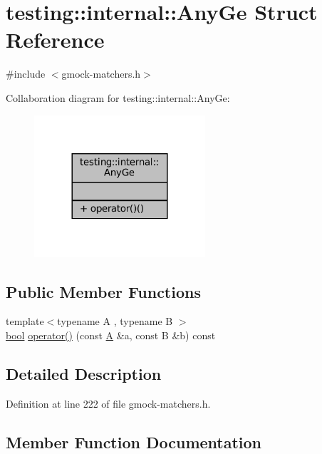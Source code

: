 \hypertarget{structtesting_1_1internal_1_1AnyGe}{}\section{testing\+:\+:internal\+:\+:Any\+Ge Struct Reference}
\label{structtesting_1_1internal_1_1AnyGe}


{\ttfamily \#include $<$gmock-\/matchers.\+h$>$}



Collaboration diagram for testing\+:\+:internal\+:\+:Any\+Ge\+:
\nopagebreak
\begin{figure}[H]
\begin{center}
\leavevmode
\includegraphics[width=180pt]{structtesting_1_1internal_1_1AnyGe__coll__graph}
\end{center}
\end{figure}
\subsection*{Public Member Functions}
\begin{DoxyCompactItemize}
\item 
{\footnotesize template$<$typename A , typename B $>$ }\\\hyperlink{classbool}{bool} \hyperlink{structtesting_1_1internal_1_1AnyGe_ac4bace6395f9517bc93f34bc1479227d}{operator()} (const \hyperlink{namespacetesting_a5e9134d655d2fc9323902348083282e7}{A} \&a, const B \&b) const
\end{DoxyCompactItemize}


\subsection{Detailed Description}


Definition at line 222 of file gmock-\/matchers.\+h.



\subsection{Member Function Documentation}
\mbox{\label{structtesting_1_1internal_1_1AnyGe_ac4bace6395f9517bc93f34bc1479227d}} 
